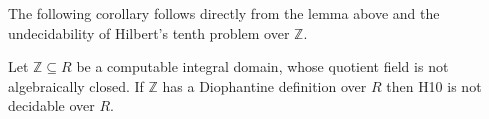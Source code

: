 The following corollary follows directly from the lemma above and the
undecidability of Hilbert's tenth problem over $ℤ$.

\begin{cor}
  Let $ℤ \subseteq R$ be a computable integral domain, whose quotient field is
  not algebraically closed. If $ℤ$ has a Diophantine definition over $R$ then
  \textsc{H10} is not decidable over $R$.
\end{cor}
